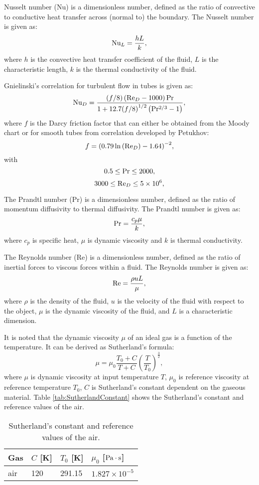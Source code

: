 \documentclass[preprint,5p,twocolumn,11pt,sort&compress]{elsarticle}
\begin{document}
Nusselt number (Nu) is a dimensionless number, defined as the ratio of convective to conductive heat transfer across (normal to) the boundary.
The Nusselt number is given as:
\[{\rm{N}}{{\rm{u}}_L} = \frac{{hL}}{k},\]
where $h$ is the convective heat transfer coefficient of the fluid, $L$ is the characteristic length, $k$ is the thermal conductivity of the fluid.

Gnielinski's correlation for turbulent flow in tubes is given as:
\[{\rm{N}}{{\rm{u}}_D} = \frac{{\left( {f/8} \right)\left( {{\rm{R}}{{\rm{e}}_D} - 1000} \right){\rm{Pr}}}}{{1 + 12.7{{(f/8)}^{1/2}}\left( {{\rm{P}}{{\rm{r}}^{2/3}} - 1} \right)}},\]
where $f$ is the Darcy friction factor that can either be obtained from the Moody chart or for smooth tubes from correlation developed by Petukhov:
\[f = {\left( {0.79\ln \left( {{\rm{R}}{{\rm{e}}_D}} \right) - 1.64} \right)^{ - 2}},\]
with
\[0.5 \le {\rm{Pr}} \le 2000,\]
\[3000 \le {\rm{R}}{{\rm{e}}_D} \le 5 \times {10^6},\]

The Prandtl number (Pr) is a dimensionless number, defined as the ratio of momentum diffusivity to thermal diffusivity.
The Prandtl number is given as:
\[{\rm{Pr}} = \frac{{{c_p}\mu }}{k},\]
where
$c_{p}$ is specific heat, $\mu$ is dynamic viscosity and $k$ is thermal conductivity.

The Reynolds number (Re) is a dimensionless number, defined as the ratio of inertial forces to viscous forces within a fluid.
The Reynolds number is given as:
\[{\rm{Re}} = \frac{{\rho uL}}{\mu },\]
where
$\rho$ is the density of the fluid, $u$ is the velocity of the fluid with respect to the object, $\mu$ is the dynamic viscosity of the fluid, and $L$ is a characteristic dimension.

It is noted that the dynamic viscosity $\mu$ of an ideal gas is a function of the temperature. It can be derived as Sutherland's formula:
\[\mu  = {\mu _0}\frac{{{T_0} + C}}{{T + C}}{\left( {\frac{T}{{{T_0}}}} \right)^{\frac{3}{2}}},\]
where $\mu$ is dynamic viscosity at input temperature $T$,
$\mu_0$ is reference viscosity at reference temperature $T_0$,
$C$ is Sutherland's constant dependent on the gaseous material.
Table \autoref{tab:SutherlandConstant} shows the Sutherland's constant and reference values of the air.
\begin{table}[htbp]
  \centering
  \caption{Sutherland's constant and reference values of the air.}
    \begin{tabular}{p{2cm}p{2cm}p{2cm}p{3cm}}
    \toprule
    Gas   & $C$ [K] & $T_0$ [K] & $\mu_0$ [$\rm{Pa\cdot s}$] \\
    \midrule
    air   & 120   & 291.15 & $1.827\times 10^{-5}$ \\
    \bottomrule
    \end{tabular}%
  \label{tab:SutherlandConstant}%
\end{table}%
\end{document}
